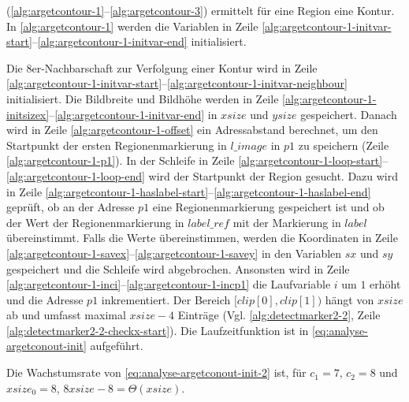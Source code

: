  (\autoref{alg:argetcontour-1}--\autoref{alg:argetcontour-3}) ermittelt für eine Region eine
 Kontur. In \autoref{alg:argetcontour-1} werden die Variablen in Zeile
 \ref{alg:argetcontour-1-initvar-start}--\ref{alg:argetcontour-1-initvar-end} initialisiert.

Die 8er-Nachbarschaft zur Verfolgung einer Kontur wird in Zeile
 \ref{alg:argetcontour-1-initvar-start}--\ref{alg:argetcontour-1-initvar-neighbour} initialisiert. Die Bildbreite und
 Bildhöhe werden in Zeile \ref{alg:argetcontour-1-initsizex}--\ref{alg:argetcontour-1-initvar-end} in $\mathit{xsize}$
 und $\mathit{ysize}$ gespeichert. Danach wird in Zeile \ref{alg:argetcontour-1-offset} ein Adressabstand berechnet, um
 den Startpunkt der ersten Regionenmarkierung in $\mathit{l\_image}$ in $\mathit{p1}$ zu speichern (Zeile
 \ref{alg:argetcontour-1-p1}). In der Schleife in Zeile
 \ref{alg:argetcontour-1-loop-start}--\ref{alg:argetcontour-1-loop-end} wird der Startpunkt der Region gesucht. Dazu
 wird in Zeile \ref{alg:argetcontour-1-haslabel-start}--\ref{alg:argetcontour-1-haslabel-end} geprüft, ob an der
 Adresse $\mathit{p1}$ eine Regionenmarkierung gespeichert ist und ob der Wert der Regionenmarkierung in
 $\mathit{label\_ref}$ mit der Markierung in $\mathit{label}$ übereinstimmt. Falls die Werte übereinstimmen, werden die
 Koordinaten in Zeile \ref{alg:argetcontour-1-savex}--\ref{alg:argetcontour-1-savey} in den Variablen $\mathit{sx}$ und
 $\mathit{sy}$ gespeichert und die Schleife wird abgebrochen. Ansonsten wird in Zeile
 \ref{alg:argetcontour-1-inci}--\ref{alg:argetcontour-1-incp1} die Laufvariable $i$ um $1$ erhöht und die Adresse
 $\mathit{p1}$ inkrementiert. Der Bereich $[\mathit{clip}[0],\mathit{clip}[1])$ hängt von $\mathit{xsize}$ ab und
 umfasst maximal $\mathit{xsize} - 4$ Einträge (Vgl. \autoref{alg:detectmarker2-2}, Zeile
 \ref{alg:detectmarker2-2-checkx-start}). Die Laufzeitfunktion ist in \autoref{eq:analyse-argetconout-init} aufgeführt.

Die Wachstumsrate von \autoref{eq:analyse-argetconout-init-2} ist, für $c_{1} = 7$, $c_{2} = 8$ und
 $\mathit{xsize}_0 = 8$, $8\mathit{xsize} - 8 = \Theta(\mathit{xsize})$.

